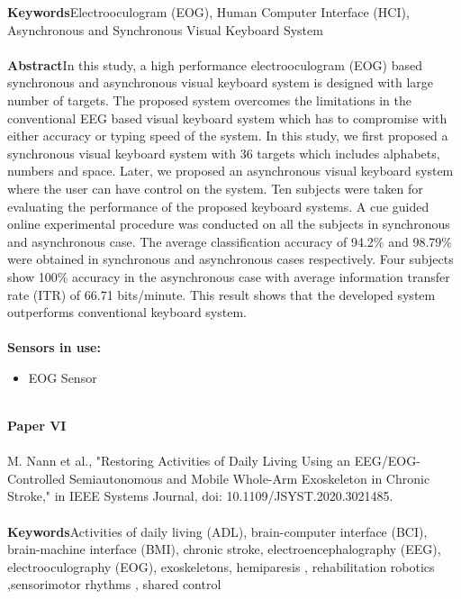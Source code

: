 \noindent
\textbf{Keywords}Electrooculogram (EOG), Human Computer Interface (HCI), Asynchronous and Synchronous Visual Keyboard System\\ \\

\noindent
\textbf{Abstract}In this study, a high performance electrooculogram (EOG) based synchronous and asynchronous visual keyboard system is designed with large number of targets. The proposed system overcomes the limitations in the conventional EEG based visual keyboard system which has to compromise with either accuracy or typing speed of the system. In this study, we first proposed a synchronous visual keyboard system with 36 targets which includes alphabets, numbers and space. Later, we proposed an asynchronous visual keyboard system where the user can have control on the system. Ten subjects were taken for evaluating the performance of the proposed keyboard systems. A cue guided online experimental procedure was conducted on all the subjects in synchronous and asynchronous case. The average classification accuracy of 94.2\% and 98.79\% were obtained in synchronous and asynchronous cases respectively. Four subjects show 100\% accuracy in the asynchronous case with average information transfer rate (ITR) of 66.71 bits/minute. This result shows that the developed system outperforms conventional keyboard system.
\\ \\


\noindent
\textbf{Sensors in use:}
\begin{itemize}
    \item EOG Sensor \\ \\
\end{itemize}

\noindent
\textbf{Paper VI} 
\\ \\
\noindent
M. Nann et al., "Restoring Activities of Daily Living Using an EEG/EOG-Controlled Semiautonomous and Mobile Whole-Arm Exoskeleton in Chronic Stroke," in IEEE Systems Journal, doi: 10.1109/JSYST.2020.3021485.\\ \\


\noindent
\textbf{Keywords}Activities of daily living (ADL), brain-computer interface (BCI), brain-machine interface (BMI), chronic stroke, electroencephalography (EEG), electrooculography (EOG), exoskeletons, hemiparesis , rehabilitation robotics ,sensorimotor rhythms , shared control\\ \\

